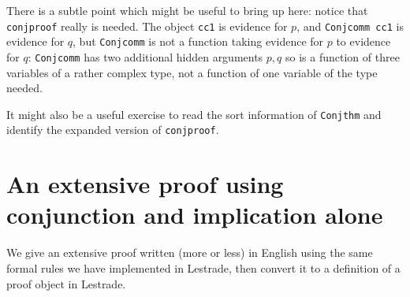 \documentclass[12pt]{article}
\begin{document}
There is a subtle point which might be useful to bring up here:  notice that {\tt conjproof} really is needed.  The object {\tt cc1} is evidence for $p$, and {\tt Conjcomm cc1} is evidence for $q$,
but {\tt Conjcomm} is not a function taking evidence for $p$ to evidence for $q$:  {\tt Conjcomm} has two additional hidden arguments $p,q$ so is a function of three variables of a rather complex type, not a function of one variable of the type needed.

It might also be a useful exercise to read the sort information of {\tt Conjthm} and identify the expanded version of {\tt conjproof}.

\section{An extensive proof using conjunction and implication alone}

We give an extensive proof written (more or less) in English using the same formal rules we have implemented in Lestrade, then convert it to a definition of a proof object in Lestrade.
\end{document}
